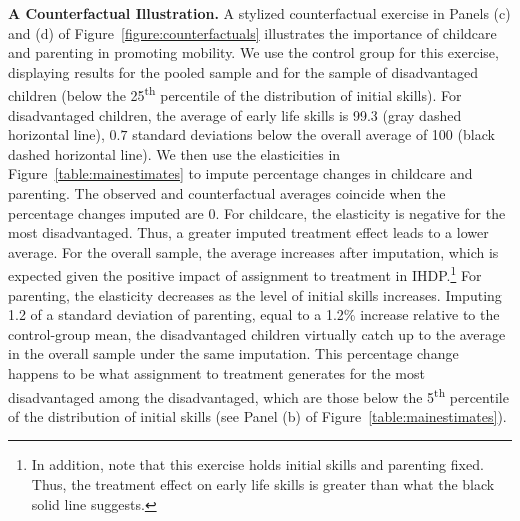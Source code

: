 \noindent \textbf{A Counterfactual Illustration.} A stylized counterfactual exercise in Panels (c) and (d) of Figure~\ref{figure:counterfactuals} illustrates the importance of childcare and parenting in promoting mobility. We use the control group for this exercise, displaying results for the pooled sample and for the sample of disadvantaged children (below the 25\textsuperscript{th} percentile of the distribution of initial skills). For disadvantaged children, the average of early life skills is 99.3 (gray dashed horizontal line), $0.7$ standard deviations below the overall average of 100 (black dashed horizontal line). We then use the elasticities in Figure~\ref{table:mainestimates} to impute percentage changes in childcare and parenting. The observed and counterfactual averages coincide when the percentage changes imputed are 0. For childcare, the elasticity is negative for the most disadvantaged. Thus, a greater imputed treatment effect leads to a lower average. For the overall sample, the average increases after imputation, which is expected given the positive impact of assignment to treatment in IHDP.\footnote{In addition, note that this exercise holds initial skills and parenting fixed. Thus, the treatment effect on early life skills is greater than what the black solid line suggests.} For parenting, the elasticity decreases as the level of initial skills increases. Imputing 1.2 of a standard deviation of parenting, equal to a 1.2\% increase relative to the control-group mean, the disadvantaged children virtually catch up to the average in the overall sample under the same imputation. This percentage change happens to be what assignment to treatment generates for the most disadvantaged among the disadvantaged, which are those below the 5\textsuperscript{th} percentile of the distribution of initial skills (see Panel (b) of Figure~\ref{table:mainestimates}). 

